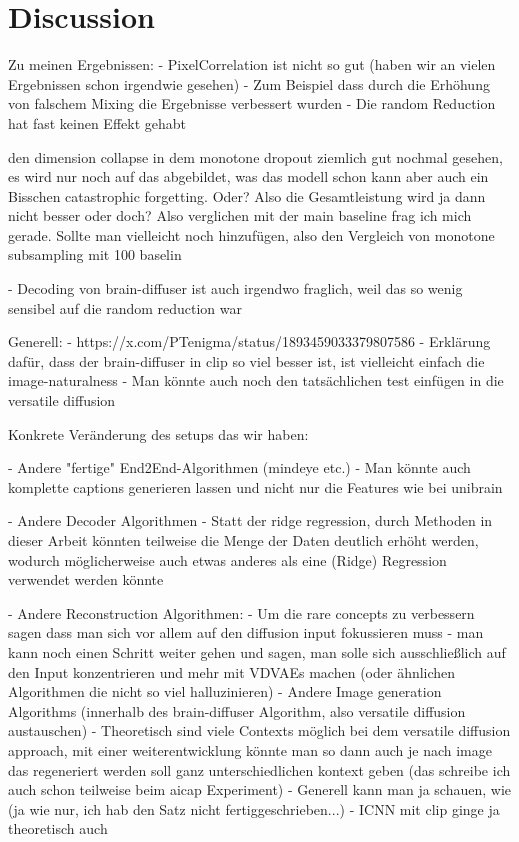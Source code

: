 \chapter{Discussion}


Zu meinen Ergebnissen:
- PixelCorrelation ist nicht so gut (haben wir an vielen Ergebnissen schon irgendwie gesehen)
    - Zum Beispiel dass durch die Erhöhung von falschem Mixing die Ergebnisse verbessert wurden
    - Die random Reduction hat fast keinen Effekt gehabt


den dimension collapse in dem monotone dropout ziemlich gut nochmal gesehen, es wird nur noch auf das abgebildet, was das modell schon kann
aber auch ein Bisschen catastrophic forgetting. 
Oder?
Also die Gesamtleistung wird ja dann nicht besser oder doch?
Also verglichen mit der main baseline frag ich mich gerade.
Sollte man vielleicht noch hinzufügen, also den Vergleich von monotone subsampling mit 100 baselin

- Decoding von brain-diffuser ist auch irgendwo fraglich, weil das so wenig sensibel auf die random reduction war

Generell:
- https://x.com/PTenigma/status/1893459033379807586
- Erklärung dafür, dass der brain-diffuser in clip so viel besser ist, ist vielleicht einfach die image-naturalness
- Man könnte auch noch den tatsächlichen test einfügen in die versatile diffusion

Konkrete Veränderung des setups das wir haben:

- Andere "fertige" End2End-Algorithmen (mindeye etc.)
    - Man könnte auch komplette captions generieren lassen und nicht nur die Features wie bei unibrain \cite{maiUniBrainUnifyImage2023}

- Andere Decoder Algorithmen 
    - Statt der ridge regression, durch Methoden in dieser Arbeit könnten teilweise die Menge der Daten deutlich erhöht werden, wodurch möglicherweise auch etwas anderes als eine (Ridge) Regression verwendet werden könnte

- Andere Reconstruction Algorithmen:
    - Um die rare concepts zu verbessern sagen \cite{samuelGeneratingImagesRare2024} dass man sich vor allem auf den diffusion input fokussieren muss
        - man kann noch einen Schritt weiter gehen und sagen, man solle sich ausschließlich auf den Input konzentrieren und mehr mit VDVAEs machen (oder ähnlichen Algorithmen die nicht so viel halluzinieren)
    - Andere Image generation Algorithms (innerhalb des brain-diffuser Algorithm, also versatile diffusion austauschen)
    - Theoretisch sind viele Contexts möglich bei dem versatile diffusion approach, mit einer weiterentwicklung könnte man so dann auch je nach image das regeneriert werden soll ganz unterschiedlichen kontext geben (das schreibe ich auch schon teilweise beim aicap Experiment)
    - Generell kann man ja schauen, wie (ja wie nur, ich hab den Satz nicht fertiggeschrieben...)
    - ICNN mit clip ginge ja theoretisch auch

